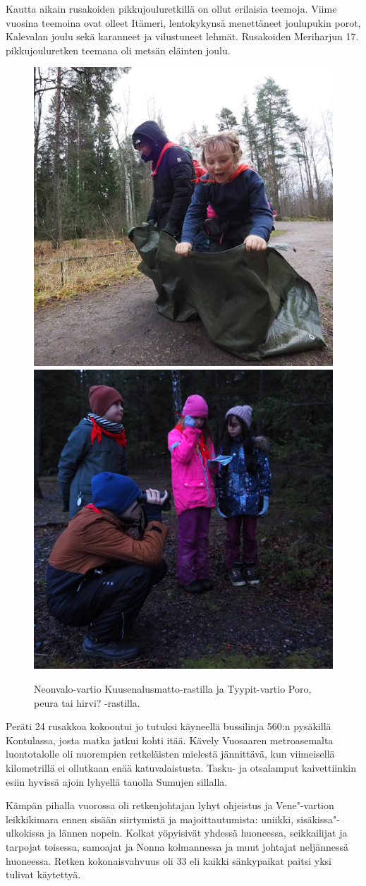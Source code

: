 \begin{multicols}{2}
\noindent Kautta aikain rusakoiden pikkujouluretkillä on ollut erilaisia 
teemoja. Viime vuosina teemoina ovat olleet Itämeri, lentokykynsä 
menettäneet joulupukin porot, Kalevalan joulu sekä karanneet ja vilustuneet 
lehmät. Rusakoiden Meriharjun 17. pikkujouluretken teemana oli metsän 
eläinten joulu. 

\begin{figure}[!t]
\centering\includegraphics[width=.475\textwidth]{assets/meriharjuTaikamatto}\hfill\includegraphics[width=.475\textwidth]{assets/meriharjuLinnut}
\caption{Neonvalo-vartio Kuusenalusmatto-rastilla ja Tyypit-vartio Poro, peura tai hirvi? -rastilla.}
\end{figure}

Peräti 24 rusakkoa kokoontui jo tutuksi käyneellä bussilinja 560:n 
pysäkillä Kontulassa, josta matka jatkui kohti itää. Kävely Vuosaaren 
metroasemalta luontotalolle oli nuorempien retkeläisten mielestä 
jännittävä, kun viimeisellä kilometrillä ei ollutkaan enää 
katuvalaistusta. Tasku- ja otsalamput kaivettiinkin esiin hyvissä ajoin 
lyhyellä tauolla Sumujen sillalla. 

Kämpän pihalla vuorossa oli retkenjohtajan lyhyt ohjeistus ja Vene"-vartion 
leikkikimara ennen sisään siirtymistä ja majoittautumista: uniikki, 
sisäkissa"-ulkokissa ja lännen nopein. Kolkat yöpyisivät yhdessä 
huoneessa, seikkailijat ja tarpojat toisessa, samoajat ja Nonna kolmannessa ja 
muut johtajat neljännessä huoneessa. Retken kokonaisvahvuus oli 33 eli kaikki 
sänkypaikat paitsi yksi tulivat käytettyä.


\end{multicols}
